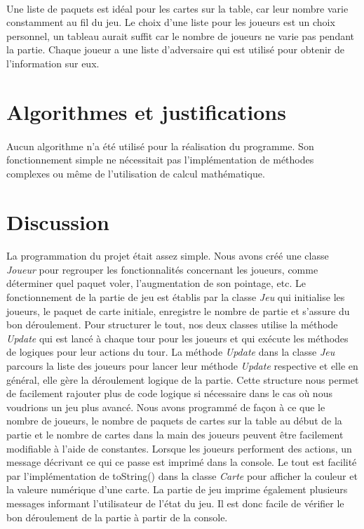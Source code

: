 \documentclass[11pt, french]{article} %
\begin{document}
\paragraph{}
Une liste de paquets est idéal pour les cartes sur la table, car leur nombre varie constamment au fil du jeu. Le choix d'une liste pour les joueurs est un choix personnel, un tableau aurait suffit car le nombre de joueurs ne varie pas pendant la partie. Chaque joueur a une liste d'adversaire qui est utilisé pour obtenir de l'information sur eux.



\section{Algorithmes et justifications}
\paragraph{}
Aucun algorithme n'a été utilisé pour la réalisation du programme. Son fonctionnement simple ne nécessitait pas l'implémentation de méthodes complexes ou même de l'utilisation de calcul mathématique.


\section{Discussion}
\paragraph{}
La programmation du projet était assez simple. Nous avons créé une classe \textit{Joueur} pour regrouper les fonctionnalités concernant les joueurs, comme déterminer quel paquet voler, l'augmentation de son pointage, etc. Le fonctionnement de la partie de jeu est établis par la classe \textit{Jeu} qui initialise les joueurs, le paquet de carte initiale, enregistre le nombre de partie et s'assure du bon déroulement. Pour structurer le tout, nos deux classes utilise la méthode \textit{Update} qui est lancé à chaque tour pour les joueurs et qui exécute les méthodes de logiques pour leur actions du tour. La méthode \textit{Update} dans la classe \textit{Jeu} parcours la liste des joueurs pour lancer leur méthode  \textit{Update} respective et elle en général, elle gère la déroulement logique de la partie. Cette structure nous permet de facilement rajouter plus de code logique si nécessaire dans le cas où nous voudrions un jeu plus avancé. Nous avons programmé de façon à ce que le nombre de joueurs, le nombre de paquets de cartes sur la table au début de la partie et le nombre de cartes dans la main des joueurs peuvent être facilement modifiable à l'aide de constantes. Lorsque les joueurs performent des actions, un message décrivant ce qui ce passe est imprimé dans la console. Le tout est facilité par l'implémentation de toString() dans la classe \textit{Carte} pour afficher la couleur et la valeure numérique d'une carte. La partie de jeu imprime également plusieurs messages informant l'utilisateur de l'état du jeu. Il est donc facile de vérifier le bon déroulement de la partie à partir de la console.
\end{document}
